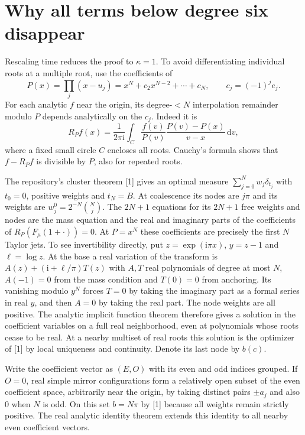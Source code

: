\documentclass[11pt]{article}
\newcommand{\dd}{\mathrm d}
\newcommand{\ii}{\mathrm i}
\begin{document}
\section{Why all terms below degree six disappear}
Rescaling time reduces the proof to $\kappa=1$. To avoid differentiating
individual roots at a multiple root, use the coefficients of
\[
 P(x)=\prod_j(x-u_j)=x^N+c_2 x^{N-2}+\cdots+c_N,
 \qquad c_j=(-1)^j e_j .
\]
For each analytic $f$ near the origin, its degree-$<N$ interpolation remainder
modulo $P$ depends analytically on the $c_j$. Indeed it is
\[
 R_P f(x)=\frac1{2\pi\ii}\int_C
 \frac{f(v)}{P(v)}\frac{P(v)-P(x)}{v-x}\,\dd v,
\]
where a fixed small circle $C$ encloses all roots. Cauchy's formula shows
that $f-R_P f$ is divisible by $P$, also for repeated roots.

The repository's cluster theorem [1] gives an optimal measure
$\sum_{j=0}^N w_j\delta_{t_j}$ with $t_0=0$, positive weights and
$t_N=B$. At coalescence its nodes are $j\pi$ and its weights are
$w_j^0=2^{-N}\binom Nj$. The $2N+1$ equations for its $2N+1$ free
weights and nodes are the mass equation and the real and imaginary parts of
the coefficients of $R_P(F_\mu(1+\cdot))=0$.
At $P=x^N$ these coefficients are precisely the first $N$ Taylor jets.
To see invertibility directly, put $z=\exp(\ii\pi x)$, $y=z-1$ and
$\ell=\log z$. At the base a real variation of the transform is
$A(z)+(\ii+\ell/\pi)T(z)$ with $A,T$ real polynomials of degree at most
$N$, $A(-1)=0$ from the mass condition and $T(0)=0$ from anchoring.
Its vanishing modulo $y^N$ forces $T=0$ by taking the imaginary part
as a formal series in real $y$, and then $A=0$ by taking the real part.
The node weights are all positive. The analytic implicit function theorem
therefore gives a solution in the coefficient variables on a full real
neighborhood, even at polynomials whose roots cease to be real.
At a nearby multiset of real roots this solution is the optimizer of [1]
by local uniqueness and continuity. Denote its last node by $b(c)$.

Write the coefficient vector as $(E,O)$ with its even and odd indices
grouped. If $O=0$, real simple mirror configurations form a relatively open
subset of the even coefficient space, arbitrarily near the origin, by taking
distinct pairs $\pm a_j$ and also $0$ when $N$ is odd. On this set
$b=N\pi$ by [1] because all weights remain strictly positive. The real
analytic identity theorem extends this identity to all nearby even
coefficient vectors.
\end{document}
